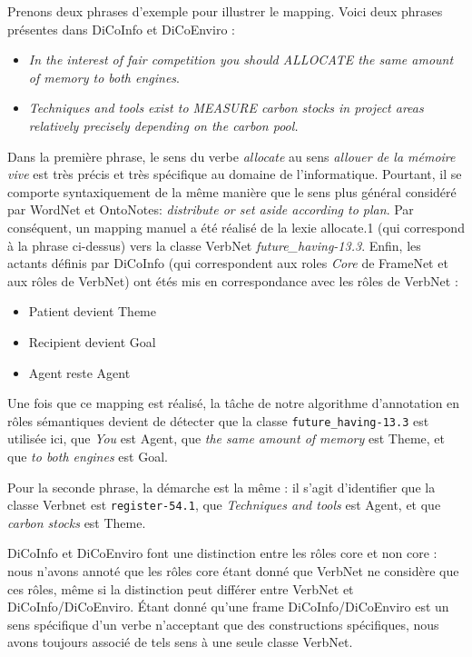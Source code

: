 Prenons deux phrases d'exemple pour illustrer le mapping. Voici deux phrases
présentes dans DiCoInfo et DiCoEnviro :

\begin{itemize}

    \item \emph{In the interest of fair competition you should ALLOCATE the
        same amount of memory to both engines}.

    \item \emph{Techniques and tools exist to MEASURE carbon stocks in project areas
        relatively precisely depending on the carbon pool.}

\end{itemize}

Dans la première phrase, le sens du verbe \textit{allocate} au sens
\emph{allouer de la mémoire vive} est très précis et très spécifique au domaine
de l'informatique. Pourtant, il se comporte syntaxiquement de la même manière
que le sens plus général considéré par WordNet et OntoNotes: \textit{distribute
or set aside according to plan}. Par conséquent, un mapping manuel a été
réalisé de la lexie allocate.1 (qui correspond à la phrase ci-dessus) vers la
classe VerbNet \textit{future\_having-13.3}. Enfin, les actants définis par
DiCoInfo (qui correspondent aux roles \textit{Core} de FrameNet et aux rôles de
VerbNet) ont étés mis en correspondance avec les rôles de VerbNet :

\begin{itemize}
    \item Patient devient Theme
    \item Recipient devient Goal
    \item Agent reste Agent
\end{itemize}

Une fois que ce mapping est réalisé, la tâche de notre algorithme d'annotation
en rôles sémantiques devient de détecter que la classe \texttt{future\_having-13.3} est
utilisée ici, que \emph{You} est Agent, que \emph{the same amount of memory} est Theme,
et que \emph{to both engines} est Goal.

Pour la seconde phrase, la démarche est la même : il s'agit d'identifier que la
classe Verbnet est \texttt{register-54.1}, que \textit{Techniques and tools}
est Agent, et que \textit{carbon stocks} est Theme.

DiCoInfo et DiCoEnviro font une distinction entre les rôles core et non core :
nous n'avons annoté que les rôles core étant donné que VerbNet ne considère que
ces rôles, même si la distinction peut différer entre VerbNet et
DiCoInfo/DiCoEnviro. Étant donné qu'une frame DiCoInfo/DiCoEnviro est un sens
spécifique d'un verbe n'acceptant que des constructions spécifiques, nous avons
toujours associé de tels sens à une seule classe VerbNet.

